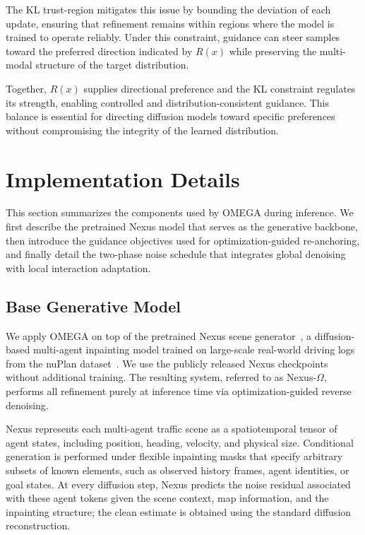 \documentclass[10pt,twocolumn,letterpaper]{article}
\theoremstyle{plain}
\theoremstyle{remark}
\begin{document}
The KL trust-region mitigates this issue by bounding the deviation of each update, ensuring that refinement remains within regions where the model is trained to operate reliably. Under this constraint, guidance can steer samples toward the preferred direction indicated by $R(x)$ while preserving the multi-modal structure of the target distribution.

Together, $R(x)$ supplies directional preference and the KL constraint regulates its strength, enabling controlled and distribution-consistent guidance. This balance is essential for directing diffusion models toward specific preferences without compromising the integrity of the learned distribution.


\section{Implementation Details}

This section summarizes the components used by OMEGA during inference.  
We first describe the pretrained Nexus model that serves as the generative backbone, then introduce the guidance objectives used for optimization-guided re-anchoring, and finally detail the two-phase noise schedule that integrates global denoising with local interaction adaptation.

\subsection{Base Generative Model}
\label{app:nexus}

We apply OMEGA on top of the pretrained {Nexus} scene generator~\cite{zhou2025decoupled}, a diffusion-based multi-agent inpainting model trained on large-scale real-world driving logs from the nuPlan dataset~\cite{caesar2021nuplan}. We use the publicly released Nexus checkpoints without additional training. The resulting system, referred to as {Nexus-$\Omega$}, performs all refinement purely at inference time via optimization-guided reverse denoising.

Nexus represents each multi-agent traffic scene as a 
spatiotemporal tensor of agent states, including position, 
heading, velocity, and physical size.  Conditional generation is 
performed under flexible inpainting masks that specify arbitrary 
subsets of known elements, such as observed history frames, agent 
identities, or goal states.  At every diffusion step, Nexus 
predicts the noise residual associated with these agent tokens 
given the scene context, map information, and the inpainting 
structure; the clean estimate is obtained using the standard diffusion reconstruction.
\end{document}
